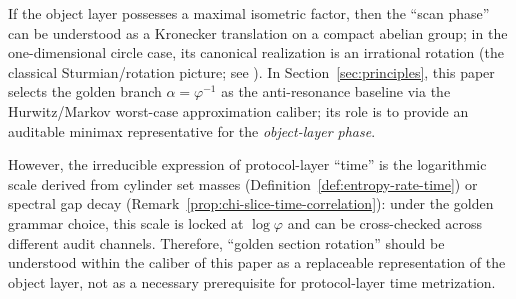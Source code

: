 \begin{remark}\label{rem:isometric-factor-vs-time-metric}
If the object layer possesses a maximal isometric factor, then the ``scan phase'' can be understood as a Kronecker translation on a compact abelian group; in the one-dimensional circle case, its canonical realization is an irrational rotation (the classical Sturmian/rotation picture; see \cite{MorseHedlund1940}).
In Section~\ref{sec:principles}, this paper selects the golden branch \(\alpha=\varphi^{-1}\) as the anti-resonance baseline via the Hurwitz/Markov worst-case approximation caliber; its role is to provide an auditable minimax representative for the \emph{object-layer phase}.\par
However, the irreducible expression of protocol-layer ``time'' is the logarithmic scale derived from cylinder set masses (Definition~\ref{def:entropy-rate-time}) or spectral gap decay (Remark~\ref{prop:chi-slice-time-correlation}): under the golden grammar choice, this scale is locked at \(\log\varphi\) and can be cross-checked across different audit channels.
Therefore, ``golden section rotation'' should be understood within the caliber of this paper as a replaceable representation of the object layer, not as a necessary prerequisite for protocol-layer time metrization.
\end{remark}









